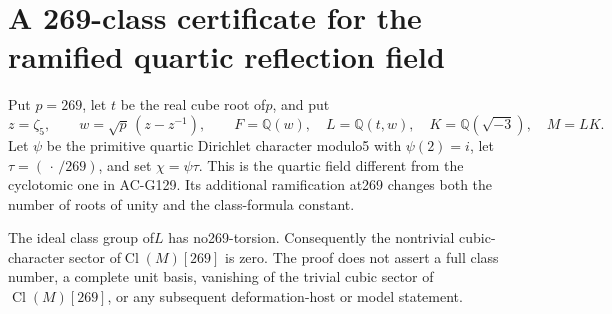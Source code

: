 \section{A 269-class certificate for the ramified quartic reflection field}
\label{sec:cubic-ramified-quartic-class-certificate}

Put $p=269$, let $t$ be the real cube root of$p$, and put
\[
 z=\zeta_5,\qquad w=\sqrt p\,(z-z^{-1}),\qquad
 F=\mathbb Q(w),\quad L=\mathbb Q(t,w),\quad
 K=\mathbb Q(\sqrt{-3}),\quad M=LK.
 \tag{RQC.1}
\]
Let $\psi$ be the primitive quartic Dirichlet character modulo5 with
$\psi(2)=i$, let $\tau=(\,\cdot\,/269)$, and set $\chi=\psi\tau$.
This is the quartic field different from the cyclotomic one in
AC-G129.  Its additional ramification at269 changes both the number
of roots of unity and the class-formula constant.

\begin{theorem}
\label{AC-G133-quartic-class}
The ideal class group of$L$ has no269-torsion.  Consequently the
nontrivial cubic-character sector of$\operatorname{Cl}(M)[269]$ is zero.
The proof does not assert a full class number, a complete unit basis,
vanishing of the trivial cubic sector of$\operatorname{Cl}(M)[269]$,
or any subsequent deformation-host or model statement.
\end{theorem}

